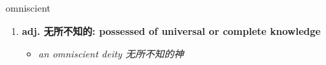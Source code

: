 
\begin{frame}
{\huge omniscient}
\begin{center}
\begin{enumerate}\Large
  \item \textbf{adj. 无所不知的: possessed of universal or complete knowledge}
  \begin{itemize}
    \item \em{\Large{an omniscient deity 无所不知的神}}
  \end{itemize}
\end{enumerate}
\end{center}
\end{frame}
